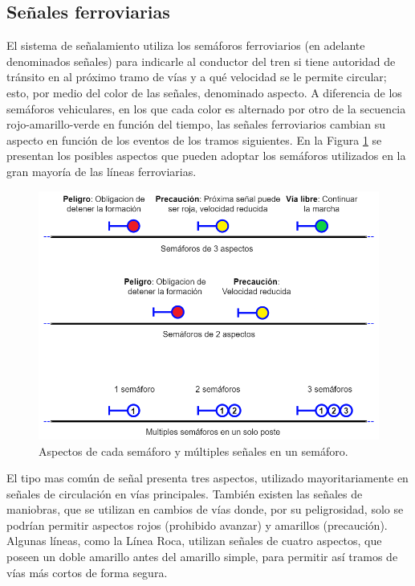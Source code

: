 \subsection{Señales ferroviarias}

    El sistema de señalamiento utiliza los semáforos ferroviarios (en adelante denominados señales) para indicarle al conductor del tren si tiene autoridad de tránsito en al próximo tramo de vías y a qué velocidad se le permite circular; esto, por medio del color de las señales, denominado aspecto. A diferencia de los semáforos vehiculares, en los que cada color es alternado por otro de la secuencia rojo-amarillo-verde en función del tiempo, las señales ferroviarios cambian su aspecto en función de los eventos de los tramos siguientes. En la Figura \ref{fig:signal_1} se presentan los posibles aspectos que pueden adoptar los semáforos utilizados en la gran mayoría de las líneas ferroviarias.

    \begin{figure}[!h]
        \centering
        \includegraphics[width=1\textwidth]{Figuras/Semaforo3.png}
        \centering\caption{Aspectos de cada semáforo y múltiples señales en un semáforo.}
        \label{fig:signal_1}
    \end{figure}

    El tipo mas común de señal presenta tres aspectos, utilizado mayoritariamente en señales de circulación en vías principales. También existen las señales de maniobras, que se utilizan en cambios de vías donde, por su peligrosidad, solo se podrían permitir aspectos rojos (prohibido avanzar) y amarillos (precaución). Algunas líneas, como la Línea Roca, utilizan señales de cuatro aspectos, que poseen un doble amarillo antes del amarillo simple, para permitir así tramos de vías más cortos de forma segura.

